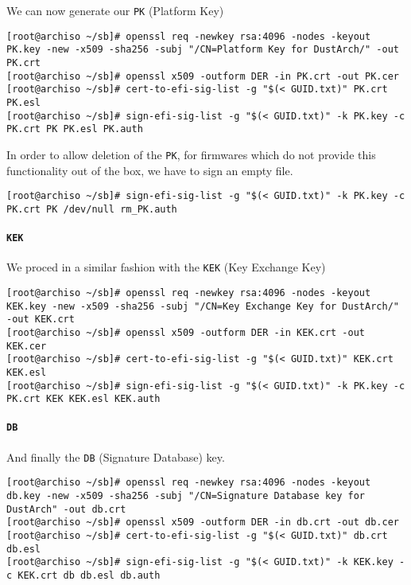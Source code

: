 \documentclass[10pt]{dustdoc}
\begin{document}
We can now generate our \texttt{PK} (Platform Key)

\begin{verbatim}
[root@archiso ~/sb]# openssl req -newkey rsa:4096 -nodes -keyout PK.key -new -x509 -sha256 -subj "/CN=Platform Key for DustArch/" -out PK.crt
[root@archiso ~/sb]# openssl x509 -outform DER -in PK.crt -out PK.cer
[root@archiso ~/sb]# cert-to-efi-sig-list -g "$(< GUID.txt)" PK.crt PK.esl
[root@archiso ~/sb]# sign-efi-sig-list -g "$(< GUID.txt)" -k PK.key -c PK.crt PK PK.esl PK.auth
\end{verbatim}

In order to allow deletion of the \texttt{PK}, for firmwares which do not provide this functionality out of the box, we have to sign an empty file.

\begin{verbatim}
[root@archiso ~/sb]# sign-efi-sig-list -g "$(< GUID.txt)" -k PK.key -c PK.crt PK /dev/null rm_PK.auth
\end{verbatim}

\paragraph{\texttt{KEK}}
\label{par:kek}

We proced in a similar fashion with the \texttt{KEK} (Key Exchange Key)

\begin{verbatim}
[root@archiso ~/sb]# openssl req -newkey rsa:4096 -nodes -keyout KEK.key -new -x509 -sha256 -subj "/CN=Key Exchange Key for DustArch/" -out KEK.crt
[root@archiso ~/sb]# openssl x509 -outform DER -in KEK.crt -out KEK.cer
[root@archiso ~/sb]# cert-to-efi-sig-list -g "$(< GUID.txt)" KEK.crt KEK.esl
[root@archiso ~/sb]# sign-efi-sig-list -g "$(< GUID.txt)" -k PK.key -c PK.crt KEK KEK.esl KEK.auth
\end{verbatim}

\paragraph{\texttt{DB}}
\label{par:db}

And finally the \texttt{DB} (Signature Database) key.

\begin{verbatim}
[root@archiso ~/sb]# openssl req -newkey rsa:4096 -nodes -keyout db.key -new -x509 -sha256 -subj "/CN=Signature Database key for DustArch" -out db.crt
[root@archiso ~/sb]# openssl x509 -outform DER -in db.crt -out db.cer
[root@archiso ~/sb]# cert-to-efi-sig-list -g "$(< GUID.txt)" db.crt db.esl
[root@archiso ~/sb]# sign-efi-sig-list -g "$(< GUID.txt)" -k KEK.key -c KEK.crt db db.esl db.auth
\end{verbatim}
\end{document}
